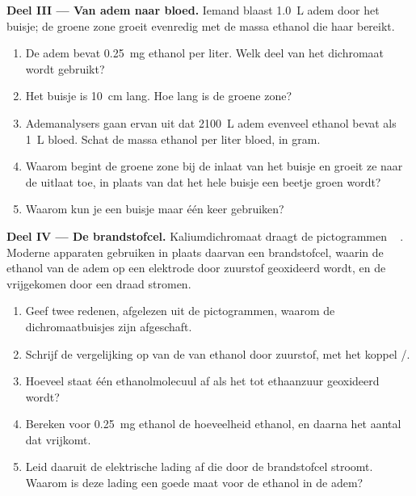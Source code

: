\begin{problem}
\medskip
\noindent\textbf{Deel III --- Van adem naar bloed.}
Iemand blaast \qty{1.0}{L} adem door het buisje; de groene zone groeit
evenredig met de massa ethanol die haar bereikt.
\begin{enumerate}[resume]
  \item De adem bevat \qty{0.25}{mg} ethanol per liter. Welk deel van het
        dichromaat wordt gebruikt?
  \item Het buisje is \qty{10}{cm} lang. Hoe lang is de groene zone?
  \item Ademanalysers gaan ervan uit dat \qty{2100}{L} adem evenveel
        ethanol bevat als \qty{1}{L} bloed. Schat de massa ethanol per
        liter bloed, in gram.
  \item Waarom begint de groene zone bij de inlaat van het buisje en
        groeit ze naar de uitlaat toe, in plaats van dat het hele buisje
        een beetje groen wordt?
  \item Waarom kun je een buisje maar één keer gebruiken?
\end{enumerate}

\medskip
\noindent\textbf{Deel IV --- De brandstofcel.}
Kaliumdichromaat draagt de pictogrammen
\,\,\,\,\,.
Moderne apparaten gebruiken in plaats daarvan een brandstofcel, waarin de
ethanol van de adem op een elektrode door zuurstof geoxideerd wordt, en
de vrijgekomen  door een draad stromen.
\begin{enumerate}[resume]
  \item Geef twee redenen, afgelezen uit de pictogrammen, waarom de
        dichromaatbuisjes zijn afgeschaft.
  \item Schrijf de vergelijking op van de  van ethanol door
        zuurstof, met het koppel /.
  \item Hoeveel  staat één ethanolmolecuul af als het tot
        ethaanzuur geoxideerd wordt?
  \item Bereken voor \qty{0.25}{mg} ethanol de hoeveelheid ethanol, en
        daarna het aantal  dat vrijkomt.
  \item Leid daaruit de elektrische lading af die door de brandstofcel
        stroomt. Waarom is deze lading een goede maat voor de ethanol in
        de adem?
\end{enumerate}
\end{problem}
